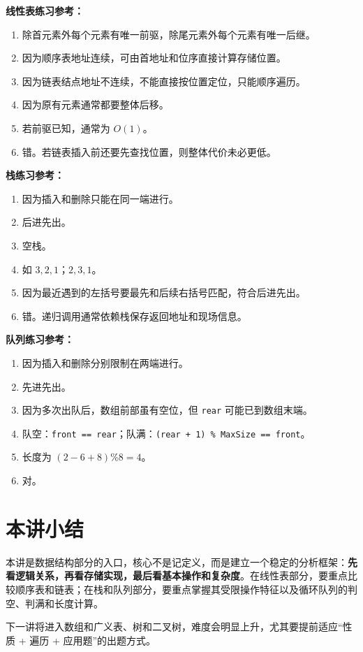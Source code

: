 \documentclass{../../note}
\begin{document}
\textbf{线性表练习参考：}

\begin{enumerate}
  \item 除首元素外每个元素有唯一前驱，除尾元素外每个元素有唯一后继。
  \item 因为顺序表地址连续，可由首地址和位序直接计算存储位置。
  \item 因为链表结点地址不连续，不能直接按位置定位，只能顺序遍历。
  \item 因为原有元素通常都要整体后移。
  \item 若前驱已知，通常为 $O(1)$。
  \item 错。若链表插入前还要先查找位置，则整体代价未必更低。
\end{enumerate}

\textbf{栈练习参考：}

\begin{enumerate}
  \item 因为插入和删除只能在同一端进行。
  \item 后进先出。
  \item 空栈。
  \item 如 $3,2,1$；$2,3,1$。
  \item 因为最近遇到的左括号要最先和后续右括号匹配，符合后进先出。
  \item 错。递归调用通常依赖栈保存返回地址和现场信息。
\end{enumerate}

\textbf{队列练习参考：}

\begin{enumerate}
  \item 因为插入和删除分别限制在两端进行。
  \item 先进先出。
  \item 因为多次出队后，数组前部虽有空位，但 \texttt{rear} 可能已到数组末端。
  \item 队空：\texttt{front == rear}；队满：\texttt{(rear + 1) \% MaxSize == front}。
  \item 长度为 $(2 - 6 + 8) \% 8 = 4$。
  \item 对。
\end{enumerate}

\section{本讲小结}

本讲是数据结构部分的入口，核心不是记定义，而是建立一个稳定的分析框架：\textbf{先看逻辑关系，再看存储实现，最后看基本操作和复杂度}。在线性表部分，要重点比较顺序表和链表；在栈和队列部分，要重点掌握其受限操作特征以及循环队列的判空、判满和长度计算。

下一讲将进入数组和广义表、树和二叉树，难度会明显上升，尤其要提前适应“性质 + 遍历 + 应用题”的出题方式。
\end{document}
